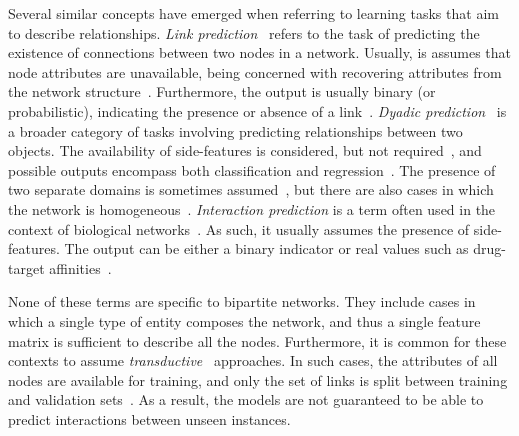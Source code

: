 Several similar concepts have emerged when referring to learning tasks that aim to describe relationships.
%
%
\emph{Link prediction}~\cite{lu2011link,zhou2021progresses} refers to the task of predicting the existence of connections between two nodes in a network. Usually, is assumes that node attributes are unavailable, being concerned with recovering attributes from the network structure~\cite{lu2011link}. Furthermore, the output is usually binary (or probabilistic), indicating the presence or absence of a link~\cite{lu2011link}.
%
%
%
%
\emph{Dyadic prediction}~\cite{menon2010loglinear,pahikkala2014twostep,jin2017multitask} is a broader category of tasks involving predicting relationships between two objects. The availability of side-features is considered, but not required~\cite{menon2010loglinear}, and possible outputs encompass both classification and regression~\cite{menon2010loglinear}. The presence of two separate domains is sometimes assumed~\cite{menon2010loglinear,pahikkala2014twostep}, but there are also cases in which the network is homogeneous~\cite{jin2017multitask}. 
%
%
\emph{Interaction prediction} is a term often used in the context of biological networks~\cite{schrynemackers2015classifying,pliakos2019network,chen2018machine,bagherian2020machine}. As such, it usually assumes the presence of side-features.
%
The output can be either a binary indicator or real values such as drug-target affinities~\cite{pahikkala2015more}.

None of these terms are specific to bipartite networks. They include cases in which a single type of entity composes the network, and thus a single feature matrix is sufficient to describe all the nodes.
Furthermore, it is common for these contexts to assume \emph{transductive}~\cite{chapelle2006semisupervised} approaches. In such cases, the attributes of all nodes are available for training, and only the set of links is split between training and validation sets~\cite{lu2011link,zhou2021progresses}. As a result, the models are not guaranteed to be able to predict interactions between unseen instances.

